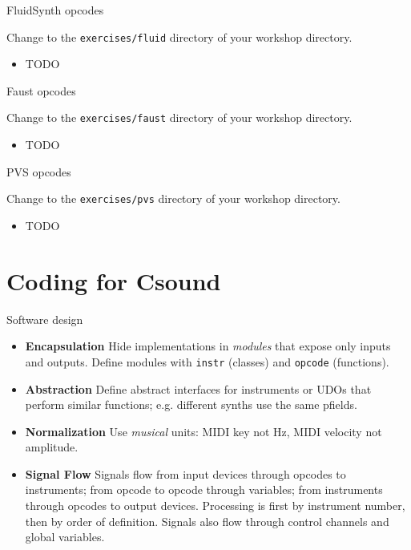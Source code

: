 \documentclass{beamer}
\begin{document}
\begin{frame}{FluidSynth opcodes}
\begin{example}
Change to the \texttt{exercises/fluid} directory of your workshop directory.
\begin{itemize}
\item TODO
\end{itemize}
\end{example}
\end{frame}

\begin{frame}{Faust opcodes}
\begin{example}
Change to the \texttt{exercises/faust} directory of your workshop directory.
\begin{itemize}
\item TODO
\end{itemize}
\end{example}
\end{frame}

\begin{frame}{PVS opcodes}
\begin{example}
Change to the \texttt{exercises/pvs} directory of your workshop directory.
\begin{itemize}
\item TODO
\end{itemize}
\end{example}
\end{frame}


\section{Coding for Csound}
\begin{frame}{Software design}
\begin{itemize}
\item \textbf{Encapsulation} Hide implementations in \textit{modules} that
expose only inputs and outputs. Define modules with \texttt{instr} (classes) and
\texttt{opcode} (functions).
\item \textbf{Abstraction} Define abstract interfaces for instruments or
UDOs that perform similar functions; e.g. different synths use the same
pfields.
\item \textbf{Normalization} Use \textit{musical} units: MIDI key not
Hz, MIDI velocity not amplitude.
\item \textbf{Signal Flow} Signals flow from input devices through
opcodes to instruments; from opcode to opcode through variables; from
instruments through opcodes to output devices. Processing is first by
instrument number, then by order of definition. Signals also flow through
control channels and global variables.
\end{itemize}
\end{frame}
\end{document}
